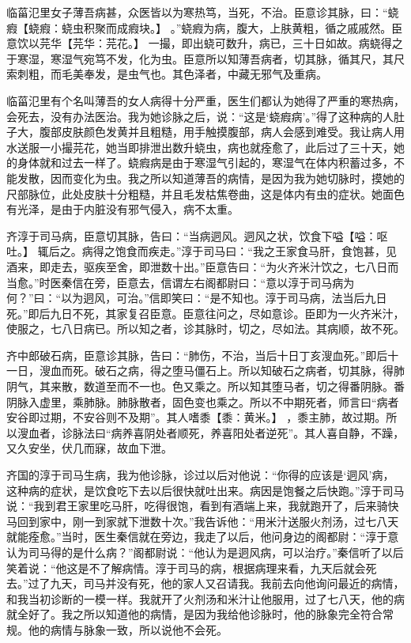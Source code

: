 \documentclass[12pt,UTF8]{ctexbook}
\begin{document}
临菑氾里女子薄吾病甚，众医皆以为寒热笃，当死，不治。臣意诊其脉，曰：“蛲瘕【蛲瘕：蛲虫积聚而成瘕块。】 。”蛲瘕为病，腹大，上肤黄粗，循之戚戚然。臣意饮以芫华【芫华：芫花。】 一撮，即出蛲可数升，病已，三十日如故。病蛲得之于寒湿，寒湿气宛笃不发，化为虫。臣意所以知薄吾病者，切其脉，循其尺，其尺索刺粗，而毛美奉发，是虫气也。其色泽者，中藏无邪气及重病。

临菑氾里有个名叫薄吾的女人病得十分严重，医生们都认为她得了严重的寒热病，会死去，没有办法医治。我为她诊脉之后，说：“这是‘蛲瘕病’。”得了这种病的人肚子大，腹部皮肤颜色发黄并且粗糙，用手触摸腹部，病人会感到难受。我让病人用水送服一小撮芫花，她当即排泄出数升蛲虫，病也就痊愈了，此后过了三十天，她的身体就和过去一样了。蛲瘕病是由于寒湿气引起的，寒湿气在体内积蓄过多，不能发散，因而变化为虫。我之所以知道薄吾的病情，是因为我为她切脉时，摸她的尺部脉位，此处皮肤十分粗糙，并且毛发枯焦卷曲，这是体内有虫的症状。她面色有光泽，是由于内脏没有邪气侵入，病不太重。

齐淳于司马病，臣意切其脉，告曰：“当病迵风。迵风之状，饮食下嗌【嗌：呕吐。】 辄后之。病得之饱食而疾走。”淳于司马曰：“我之王家食马肝，食饱甚，见酒来，即走去，驱疾至舍，即泄数十出。”臣意告曰：“为火齐米汁饮之，七八日而当愈。”时医秦信在旁，臣意去，信谓左右阁都尉曰：“意以淳于司马病为何？”曰：“以为迵风，可治。”信即笑曰：“是不知也。淳于司马病，法当后九日死。”即后九日不死，其家复召臣意。臣意往问之，尽如意诊。臣即为一火齐米汁，使服之，七八日病已。所以知之者，诊其脉时，切之，尽如法。其病顺，故不死。

齐中郎破石病，臣意诊其脉，告曰：“肺伤，不治，当后十日丁亥溲血死。”即后十一日，溲血而死。破石之病，得之堕马僵石上。所以知破石之病者，切其脉，得肺阴气，其来散，数道至而不一也。色又乘之。所以知其堕马者，切之得番阴脉。番阴脉入虚里，乘肺脉。肺脉散者，固色变也乘之。所以不中期死者，师言曰“病者安谷即过期，不安谷则不及期”。其人嗜黍【黍：黄米。】 ，黍主肺，故过期。所以溲血者，诊脉法曰“病养喜阴处者顺死，养喜阳处者逆死”。其人喜自静，不躁，又久安坐，伏几而寐，故血下泄。

齐国的淳于司马生病，我为他诊脉，诊过以后对他说：“你得的应该是‘迵风’病，这种病的症状，是饮食吃下去以后很快就吐出来。病因是饱餐之后快跑。”淳于司马说：“我到君王家里吃马肝，吃得很饱，看到有酒端上来，我就跑开了，后来骑快马回到家中，刚一到家就下泄数十次。”我告诉他：“用米汁送服火剂汤，过七八天就能痊愈。”当时，医生秦信就在旁边，我走了以后，他问身边的阁都尉：“淳于意认为司马得的是什么病？”阁都尉说：“他认为是迵风病，可以治疗。”秦信听了以后笑着说：“他这是不了解病情。淳于司马的病，根据病理来看，九天后就会死去。”过了九天，司马并没有死，他的家人又召请我。我前去向他询问最近的病情，和我当初诊断的一模一样。我就开了火剂汤和米汁让他服用，过了七八天，他的病就全好了。我之所以知道他的病情，是因为我给他诊脉时，他的脉象完全符合常规。他的病情与脉象一致，所以说他不会死。
\end{document}
